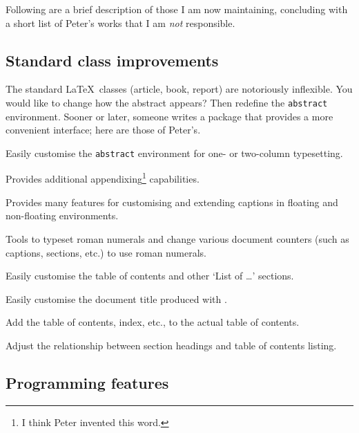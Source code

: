 \documentclass{ltugboat}
\begin{document}
Following are a brief description of those I am now maintaining, concluding with a short list of Peter's works that I am \emph{not} responsible.

\subsection{Standard class improvements}

The standard \LaTeX\ classes (\textsf{article}, \textsf{book}, \textsf{report}) are notoriously inflexible. You would like to change how the abstract appears? Then redefine the \texttt{abstract} environment. Sooner or later, someone writes a package that provides a more convenient interface; here are those of Peter's.

\begin{description}[font=\normalfont\sffamily]
\item [abstract] Easily customise the \texttt{abstract} environment for one- or two-column typesetting.
\item [appendix] Provides additional appendixing\footnote{I think Peter invented this word.} capabilities.
\item [ccaption] Provides many features for customising and extending captions in floating and non-floating environments.
\item [romannum] Tools to typeset roman numerals and change various document counters (such as captions, sections, etc.) to use roman numerals.
\item [tocloft] Easily customise the table of contents and other `List of \dots' sections.
\item [titling] Easily customise the document title produced with .
\item [tocbibind] Add the table of contents, index, etc., to the actual table of contents.
\item [tocvsec2] Adjust the relationship between section headings and table of contents listing.
\end{description}

\subsection{Programming features}
\end{document}
